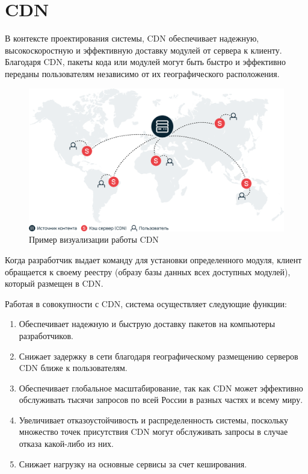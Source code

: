 \section{CDN}


В контексте проектирования системы, CDN обеспечивает надежную, высокоскоростную и эффективную доставку модулей от сервера к клиенту. Благодаря CDN, пакеты кода или модулей могут быть быстро и эффективно переданы пользователям независимо от их географического расположения.

\begin{figure}
  \centering
  \includegraphics[width=.8\textwidth]{graphics/img/sheme-cdn}
  \caption{Пример визуализации работы CDN}
  \label{fig:mono}
\end{figure}

Когда разработчик выдает команду для установки определенного модуля, клиент обращается к своему реестру (образу базы данных всех доступных модулей), который размещен в CDN.

Работая в совокупности с CDN, система осуществляет следующие функции:

\begin{enumerate}
    \item Обеспечивает надежную и быструю доставку пакетов на компьютеры разработчиков.
    \item Снижает задержку в сети благодаря географическому размещению серверов CDN ближе к пользователям.
    \item Обеспечивает глобальное масштабирование, так как CDN может эффективно обслуживать тысячи запросов по всей России в разных частях и всему миру.
    \item Увеличивает отказоустойчивость и распределенность системы, поскольку множество точек присутствия CDN могут обслуживать запросы в случае отказа какой-либо из них.
    \item Снижает нагрузку на основные сервисы за счет кеширования.
\end{enumerate}

